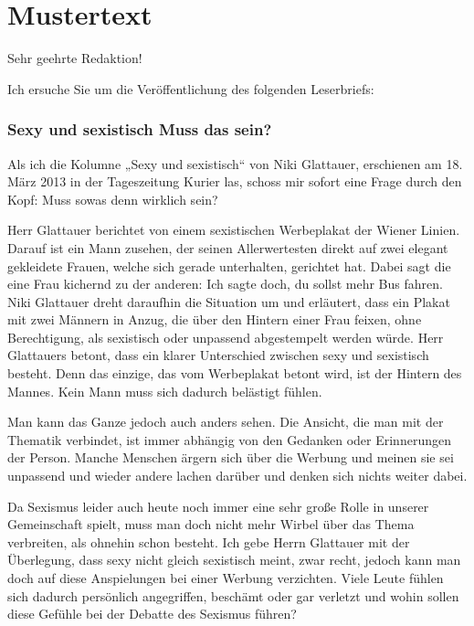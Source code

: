 


\section{Mustertext}

Sehr geehrte Redaktion! 

Ich ersuche Sie um die Veröffentlichung des folgenden Leserbriefs: 
\subsubsection{Sexy und sexistisch  Muss das sein? }

Als ich die Kolumne „Sexy und sexistisch“ von Niki Glattauer, erschienen am 18. März 2013 in der Tageszeitung Kurier las, schoss mir sofort eine Frage durch den Kopf: Muss sowas denn wirklich sein?  

Herr Glattauer berichtet von einem sexistischen Werbeplakat der Wiener Linien. Darauf ist ein Mann zusehen, der seinen Allerwertesten direkt auf zwei elegant gekleidete Frauen, welche sich gerade unterhalten, gerichtet hat. Dabei sagt die eine Frau kichernd zu der anderen: Ich sagte doch, du sollst mehr Bus fahren. Niki Glattauer dreht daraufhin die Situation um und erläutert, dass ein Plakat mit zwei Männern in Anzug, die über den Hintern einer Frau feixen, ohne Berechtigung, als sexistisch oder unpassend abgestempelt werden würde. Herr Glattauers betont, dass ein klarer Unterschied zwischen sexy und sexistisch besteht. Denn das einzige, das vom Werbeplakat betont wird, ist der Hintern des Mannes. Kein Mann muss sich dadurch belästigt fühlen.  

Man kann das Ganze jedoch auch anders sehen. Die Ansicht, die man mit der Thematik verbindet, ist immer abhängig von den Gedanken oder Erinnerungen der Person. Manche Menschen ärgern sich über die Werbung und meinen sie sei unpassend und wieder andere lachen darüber und denken sich nichts weiter dabei.  

Da Sexismus leider auch heute noch immer eine sehr große Rolle in unserer Gemeinschaft spielt, muss man doch nicht mehr Wirbel über das Thema verbreiten, als ohnehin schon besteht. Ich gebe Herrn Glattauer mit der Überlegung, dass sexy nicht gleich sexistisch meint, zwar recht, jedoch kann man doch auf diese Anspielungen bei einer Werbung verzichten. Viele Leute fühlen sich dadurch persönlich angegriffen, beschämt oder gar verletzt und wohin sollen diese Gefühle bei der Debatte des Sexismus führen?  

